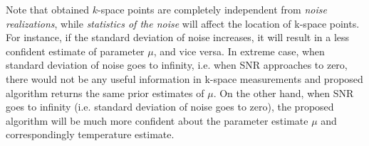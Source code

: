 \documentclass{article}         %
\theoremstyle{definition}
\theoremstyle{remark}
\begin{document}
Note that obtained $k$-space points are completely independent from \textit{noise realizations}, while \textit{statistics of the noise} will affect the location of k-space points. For instance, if the standard deviation of noise increases, it will result in a less confident estimate of parameter $\mu$, and vice versa. In extreme case, when standard deviation of noise goes to infinity, i.e. when SNR approaches to zero, there would not be any useful information in k-space measurements and proposed algorithm returns the same prior estimates of $\mu$. On the other hand, when SNR goes to infinity (i.e. standard deviation of noise goes to zero), the proposed algorithm will be much more confident about the parameter estimate $\mu$ and correspondingly temperature estimate. 

%
\end{document}
